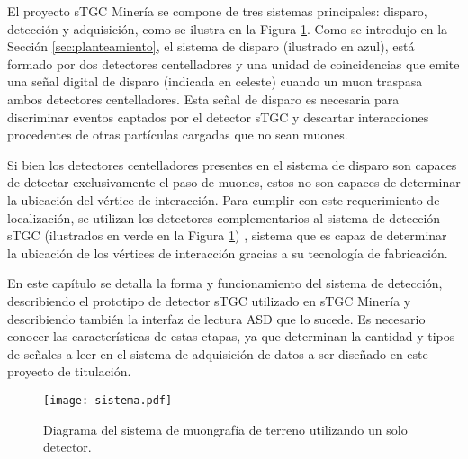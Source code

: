 El proyecto sTGC Minería se compone de tres sistemas principales: disparo, detección y adquisición, como se ilustra en la Figura \ref{fig:sistema-completo}. Como se introdujo en la Sección \ref{sec:planteamiento}, el sistema de disparo \cite{Oyanadel2020SistemaSTGC} (ilustrado en azul),  está formado por dos detectores centelladores y una unidad de coincidencias que emite una señal digital de disparo (indicada en celeste) cuando un muon traspasa ambos detectores centelladores. Esta señal de disparo es necesaria para discriminar eventos captados por el detector sTGC y descartar interacciones procedentes de otras partículas cargadas que no sean muones. 
	
Si bien los detectores centelladores presentes en el sistema de disparo son capaces de detectar exclusivamente el paso de muones, estos no son capaces de determinar la ubicación del vértice de interacción. Para cumplir con este requerimiento de localización, se utilizan los detectores complementarios al sistema de detección sTGC (ilustrados en verde en la Figura \ref{fig:sistema-completo}) , sistema que es capaz de determinar la ubicación de los vértices de interacción gracias a su tecnología de fabricación.
	
En este capítulo se detalla la forma y funcionamiento del sistema de detección, describiendo el prototipo de detector sTGC utilizado en sTGC Minería y describiendo también la interfaz de lectura ASD  que lo sucede. Es necesario conocer las características de estas etapas, ya que determinan la cantidad y tipos de señales a leer en el sistema de adquisición de datos a ser diseñado en este proyecto de titulación.
	


	\begin{figure}[h]
		\centering
		\texttt{[image: sistema.pdf]}
		\caption{Diagrama del sistema de muongrafía de terreno utilizando un solo detector.}
		\label{fig:sistema-completo}
	\end{figure}